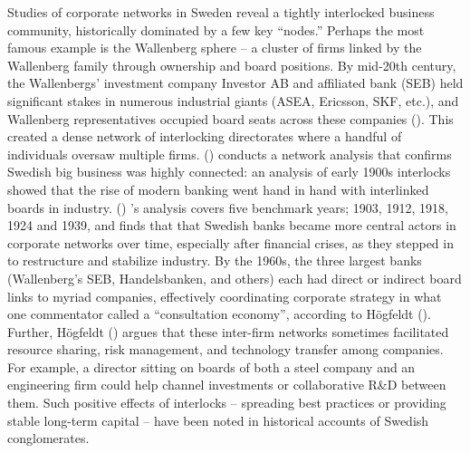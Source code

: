 \documentclass[
]{article}
\begin{document}
Studies of corporate networks in Sweden reveal a tightly interlocked
business community, historically dominated by a few key ``nodes.''
Perhaps the most famous example is the Wallenberg sphere -- a cluster of
firms linked by the Wallenberg family through ownership and board
positions. By mid-20th century, the Wallenbergs' investment company
Investor AB and affiliated bank (SEB) held significant stakes in
numerous industrial giants (ASEA, Ericsson, SKF, etc.), and Wallenberg
representatives occupied board seats across these companies
().
This created a dense network of interlocking directorates where a
handful of individuals oversaw multiple firms.
()
conducts a network analysis that confirms Swedish big business was
highly connected: an analysis of early 1900s interlocks showed that the
rise of modern banking went hand in hand with interlinked boards in
industry.
()
's analysis covers five benchmark years; 1903, 1912, 1918, 1924 and
1939, and finds that that Swedish banks became more central actors in
corporate networks over time, especially after financial crises, as they
stepped in to restructure and stabilize industry. By the 1960s, the
three largest banks (Wallenberg's SEB, Handelsbanken, and others) each
had direct or indirect board links to myriad companies, effectively
coordinating corporate strategy in what one commentator called a
``consultation economy''\hspace{0pt}, according to Högfeldt
(). Further,
Högfeldt ()
argues that these inter-firm networks sometimes facilitated resource
sharing, risk management, and technology transfer among companies. For
example, a director sitting on boards of both a steel company and an
engineering firm could help channel investments or collaborative R\&D
between them. Such positive effects of interlocks -- spreading best
practices or providing stable long-term capital -- have been noted in
historical accounts of Swedish conglomerates\hspace{0pt}.
\end{document}

